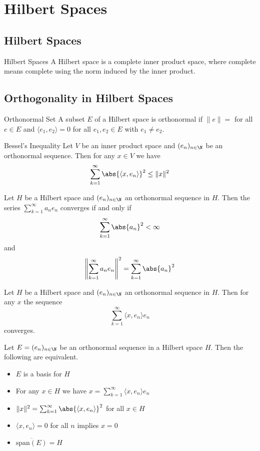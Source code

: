 \documentclass[a4paper]{article}
\begin{document}
\pagebreak
\section{Hilbert Spaces}
\subsection{Hilbert Spaces}
\begin{defn}{Hilbert Spaces}{} A Hilbert space is a complete inner product space, where complete means complete using the norm induced by the inner product. 
\end{defn}

\subsection{Orthogonality in Hilbert Spaces}
\begin{defn}{Orthonormal Set}{} A subset $E$ of a Hilbert space is orthonormal if $\|e\|=$ for all $e\in E$ and $\langle e_1,e_2\rangle=0$ for all $e_1,e_2\in E$ with $e_1\neq e_2$. 
\end{defn}

\begin{lmm}{Bessel's Inequality}{} Let $V$ be an inner product space and $(e_n)_{n\in\N}$ be an orthonormal sequence. Then for any $x\in V$ we have $$\sum_{k=1}^\infty\abs{\langle x,e_n\rangle}^2\leq \|x\|^2$$
\end{lmm}

\begin{lmm}{}{} Let $H$ be a Hilbert space and $(e_n)_{n\in\N}$ an orthonormal sequence in $H$. Then the series $\sum_{k=1}^\infty a_ne_n$ converges if and only if $$\sum_{k=1}^\infty\abs{a_n}^2<\infty$$ and $$\left\|\sum_{k=1}^\infty a_ne_n\right\|^2=\sum_{k=1}^\infty\abs{a_n}^2$$
\end{lmm}

\begin{crl}{}{} Let $H$ be a Hilbert space and $(e_n)_{n\in\N}$ an orthonormal sequence in $H$. Then for any $x$ the sequence $$\sum_{k=1}^\infty\langle x,e_n\rangle e_n$$ converges. 
\end{crl}

\begin{prp}{}{} Let $E=(e_n)_{n\in\N}$ be an orthonormal sequence in a Hilbert space $H$. Then the following are equivalent. 
\begin{itemize}
\item $E$ is a basis for $H$
\item For any $x\in H$ we have $x=\sum_{k=1}^\infty\langle x,e_n\rangle e_n$
\item $\|x\|^2=\sum_{k=1}^\infty\abs{\langle x,e_n\rangle}^2$ for all $x\in H$
\item $\langle x,e_n\rangle=0$ for all $n$ implies $x=0$
\item $\overline{\text{span}(E)}=H$
\end{itemize}
\end{prp}
\end{document}
